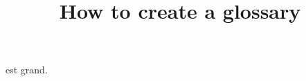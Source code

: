 \documentclass{article}
\title{How to create a glossary}
\author{ }
\date{ }
\begin{document}
\maketitle

\DieuA est grand.
 
\clearpage
 
\printglossaries
 
\end{document}
